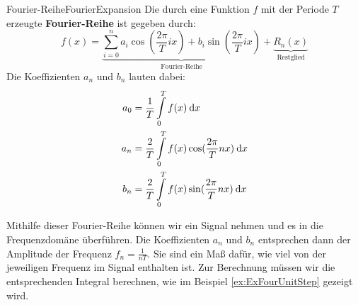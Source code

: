 \begin{definition}{Fourier-Reihe}{FourierExpansion}
    Die durch eine Funktion $f$ mit der Periode $T$ erzeugte \textbf{Fourier-Reihe} ist gegeben durch:
    $$
        f(x) = \underbrace{\sum\limits_{i=0}^n a_i \cos(\frac{2\pi}{T}ix) + b_i \sin(\frac{2\pi}{T}ix)}_{\text{Fourier-Reihe}} + \underbrace{R_n(x)}_{\text{Restglied}}
    $$
    Die Koeffizienten $a_n$ und $b_n$ lauten dabei:
    \begin{alignat*}{1}
        a_0 &= \frac{1}{T} \int\limits_0^{T} f(x) \:\mathrm{d}{x} \\
        a_n &= \frac{2}{T} \int\limits_0^{T} f(x) \cos(\frac{2\pi}{T}nx) \:\mathrm{d}{x} \\
        b_n &= \frac{2}{T} \int\limits_0^{T} f(x) \sin(\frac{2\pi}{T}nx) \:\mathrm{d}{x}
    \end{alignat*}
\end{definition}

Mithilfe dieser Fourier-Reihe können wir ein Signal nehmen und es in die Frequenzdomäne überführen. Die Koeffizienten $a_n$ und $b_n$ entsprechen dann der Amplitude der Frequenz $f_n = \frac{1}{nT}$. Sie sind ein Maß dafür, wie viel von der jeweiligen Frequenz im Signal enthalten ist. Zur Berechnung müssen wir die entsprechenden Integral berechnen, wie im Beispiel \ref{ex:ExFourUnitStep} gezeigt wird.

